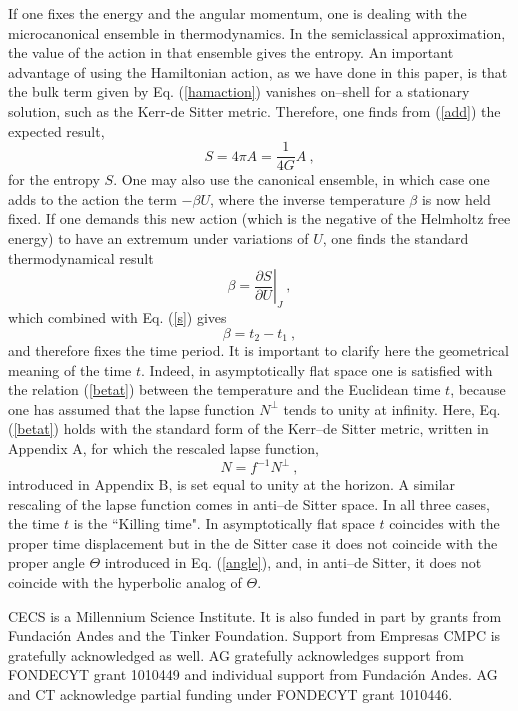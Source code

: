 \documentclass[a4paper,preprintnumbers,amsmath,amssymb]{revtex4}
\begin{document}
If one fixes the energy and the angular momentum, one is dealing with the microcanonical
ensemble in thermodynamics. In the semiclassical approximation, the value of the
action in that ensemble gives the entropy. An important advantage of using the Hamiltonian action,
as we have done in this paper, is that the bulk term given by Eq. (\ref{hamaction})
vanishes on--shell for a stationary solution, such as the Kerr-de Sitter metric.
Therefore, one finds from (\ref{add}) the expected result,
\begin{equation}
S=4\pi A = \frac{1}{4G} A \ ,
\label{entropy}
\end{equation}
for the entropy $S$.
One may also use the canonical ensemble, in which case one adds to the action the term
$-\beta U$, where the inverse temperature $\beta$ is now held fixed. If one demands this
new action (which is the negative of the Helmholtz free energy) to have an extremum under
variations of $U$, one finds the standard thermodynamical result
\begin{equation}
\beta=\left.\frac{\partial S}{\partial U}\right|_J \ ,
\label{beta}
\end{equation}
which combined with Eq. (\ref{s}) gives
\begin{equation}
\beta=t_2-t_1  \ ,
\label{betat}
\end{equation}
and therefore fixes the time period. It is important to
clarify here the geometrical meaning of the time $t$. Indeed, in asymptotically
flat space one is satisfied with the relation (\ref{betat}) between the temperature and the
Euclidean time $t$, because one has assumed that the lapse function $N^\perp$ tends to
unity at infinity. Here, Eq. (\ref{betat}) holds with the standard form of the Kerr--de Sitter metric,
written in Appendix A, for which the rescaled lapse function,
\begin{equation}
N=f^{-1} N^{\perp} \ ,
\label{resclapse}
\end{equation}
introduced in Appendix B, is set equal to unity at the horizon. A similar rescaling
of the lapse function comes in anti--de Sitter space. In all three cases, the time $t$
is the ``Killing time". In asymptotically flat space $t$ coincides with the proper time displacement but
in the de Sitter case it does not coincide with the proper angle $\Theta$ introduced in Eq. (\ref{angle}),
 and, in anti--de Sitter,  it does not coincide with the hyperbolic analog of $\Theta$.


\acknowledgments

CECS is a Millennium Science Institute. It is also funded in
part by grants from Fundaci\'on Andes and the Tinker Foundation.
Support from Empresas CMPC is gratefully acknowledged as well.
AG gratefully  acknowledges support from FONDECYT grant
1010449  and individual support from Fundaci\'on Andes.
AG and CT  acknowledge partial funding
under FONDECYT grant 1010446.
\end{document}

